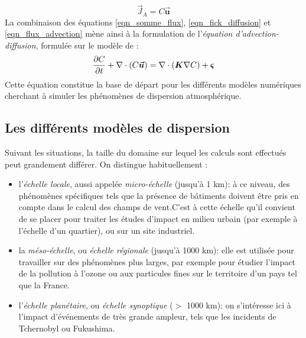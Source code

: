 	\begin{equation}
	\label{eqn_flux_advection}
	\vec{J}_A = C\bm{\vec{u}}
	\end{equation}
	La combinaison des équations \eqref{eqn_somme_flux}, \eqref{eqn_fick_diffusion} et \eqref{eqn_flux_advection} mène ainsi à la formulation de l'\textit{équation d'advection-diffusion}, formulée sur le modèle de \cite{Stockie2011}:\\
	
	\begin{equation}
		\label{eqn_advection_diffusion}
		\dfrac{\partial C}{\partial t} + \nabla \cdot(C\bm{\vec{u}}) = \nabla \cdot (\bm{K}\nabla C) + {\bm{\varsigma}}
	\end{equation}
	Cette équation constitue la base de départ pour les différents modèles numériques cherchant à simuler les phénomènes de dispersion atmosphérique.\\
	
	\subsection{Les différents modèles de dispersion}
	
	Suivant les situations, la taille du domaine sur lequel les calculs sont effectués peut grandement différer. On distingue habituellement : \\
	\begin{itemize}
		\item l'\textit{échelle locale}, aussi appelée \textit{micro-échelle} (jusqu'à 1 km): à ce niveau, des phénomènes spécifiques tels que la présence de bâtiments doivent être pris en compte dans le calcul des champs de vent.C'est à cette échelle qu'il convient de se placer pour traiter les études d'impact en milieu urbain (par exemple à l'échelle d'un quartier), ou sur un site industriel. 
		\item la \textit{méso-échelle}, ou \textit{échelle régionale} (jusqu'à 1000 km): elle est utilisée pour travailler sur des phénomènes plus larges, par exemple pour étudier l'impact de la pollution à l'ozone ou aux particules fines sur le territoire d'un pays tel que la France. 
		\item l'\textit{échelle planétaire}, ou \textit{échelle synoptique} ($>$ 1000 km): on s'intéresse ici à l'impact d'événements de très grande ampleur, tels que les incidents de Tchernobyl ou Fukushima. \\
		
	\end{itemize}
	
